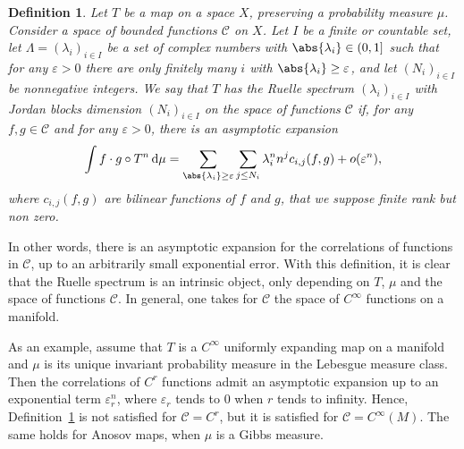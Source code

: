 \documentclass[10pt]{amsart}
\newcommand{\boC}{\mathcal{C}}
\newcommand{\dd}{\mathop{}\!\mathrm{d}}
\let\epsilon\varepsilon
\newtheorem{definition}[thm]{Definition}
\theoremstyle{definition}
\numberwithin{equation}{section}
\begin{document}
\begin{definition}
\label{defn:Ruelle_spectrum} Let $T$ be a map on a space $X$, preserving a
probability measure $\mu$. Consider a space of bounded functions $\boC$ on
$X$. Let $I$ be a finite or countable set, let $\Lambda = (\lambda_i)_{i \in
I}$ be a set of complex numbers with $\abs{\lambda_i} \in (0,1]$ such that
for any $\epsilon>0$ there are only finitely many $i$ with $\abs{\lambda_i}
\geq \epsilon$, and let $(N_i)_{i\in I}$ be nonnegative integers. We say that
$T$ has the Ruelle spectrum $(\lambda_i)_{i \in I}$ with Jordan blocks
dimension $(N_i)_{i\in I}$ on the space of functions $\boC$ if, for any $f, g
\in \boC$ and for any $\epsilon>0$, there is an asymptotic expansion
\begin{equation*}
\int f \cdot g \circ T^n \dd\mu = \sum_{\abs{\lambda_i} \geq \epsilon} \sum_{j\leq N_i} \lambda_i^n n^j c_{i,j}(f,g)
+ o(\epsilon^n),
\end{equation*}
where $c_{i,j}(f,g)$ are bilinear functions of $f$ and $g$, that we suppose finite rank but non zero.
\end{definition}

In other words, there is an asymptotic expansion for the correlations of
functions in $\boC$, up to an arbitrarily small exponential error. With this
definition, it is clear that the Ruelle spectrum is an intrinsic object, only
depending on $T$, $\mu$ and the space of functions $\boC$. In general, one
takes for $\boC$ the space of $C^\infty$ functions on a manifold.

As an example, assume that $T$ is a $C^\infty$ uniformly expanding map on a
manifold and $\mu$ is its unique invariant probability measure in the
Lebesgue measure class. Then the correlations of $C^r$ functions admit an
asymptotic expansion up to an exponential term $\epsilon_r^n$, where
$\epsilon_r$ tends to $0$ when $r$ tends to infinity. Hence,
Definition~\ref{defn:Ruelle_spectrum} is not satisfied for $\boC = C^r$, but
it is satisfied for $\boC = C^\infty(M)$. The same holds for Anosov maps,
when $\mu$ is a Gibbs measure.
\end{document}
